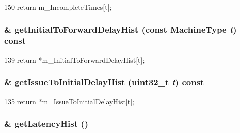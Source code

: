 \begin{DoxyCode}
150     { return m_IncompleteTimes[t]; }
\end{DoxyCode}
\hypertarget{classSequencer_a56ef3b1fa82226933191e723ad52cf12}{
\subsubsection[{getInitialToForwardDelayHist}]{\& getInitialToForwardDelayHist (const MachineType {\em t}) const}}
\label{classSequencer_a56ef3b1fa82226933191e723ad52cf12}



\begin{DoxyCode}
139     { return *m_InitialToForwardDelayHist[t]; }
\end{DoxyCode}
\hypertarget{classSequencer_a27018ff7465a95b74e4271af0669d480}{
\subsubsection[{getIssueToInitialDelayHist}]{\& getIssueToInitialDelayHist ({\bf uint32\_\-t} {\em t}) const}}
\label{classSequencer_a27018ff7465a95b74e4271af0669d480}



\begin{DoxyCode}
135     { return *m_IssueToInitialDelayHist[t]; }
\end{DoxyCode}
\hypertarget{classSequencer_ac46dd25fc33d37a54c700053c1f79314}{
\subsubsection[{getLatencyHist}]{\& getLatencyHist ()}}
\label{classSequencer_ac46dd25fc33d37a54c700053c1f79314}



